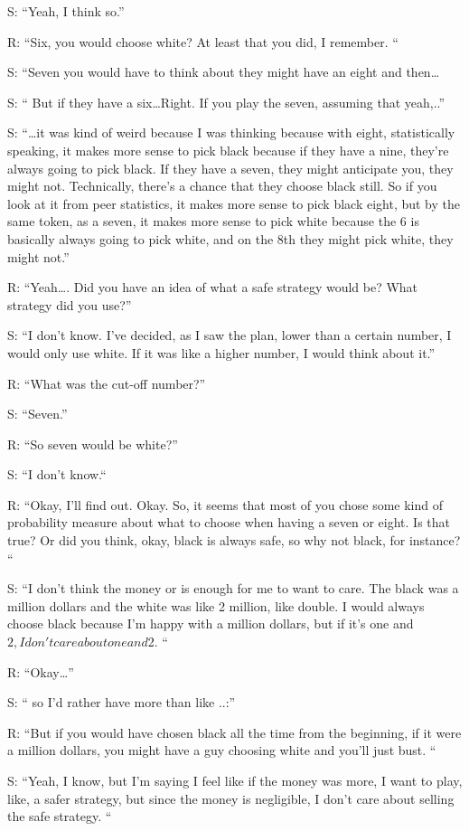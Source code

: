 \documentclass[a4paper,superscriptaddress,nofootinbib]{revtex4}
\begin{document}
S: “Yeah, I think so.”

R: “Six, you would choose white? At least that you did, I remember. “

S: “Seven you would have to think about they might have an eight and then…

S: “ But if they have a six…Right. If you play the seven, assuming that yeah,..”

S: “…it was kind of weird because I was thinking because with eight, statistically speaking, it makes more sense to pick black because if they have a nine, they're always going to pick black. If they have a seven, they might anticipate you, they might not. Technically, there's a chance that they choose black still. So if you look at it from peer statistics, it makes more sense to pick black eight, but by the same token, as a seven, it makes more sense to pick white because the 6 is basically always going to pick white, and on the 8th they might pick white, they might not.”

R: “Yeah…. Did you have an idea of what a safe strategy would be? What strategy did you use?”

S: “I don't know. I've decided, as I saw the plan, lower than a certain number, I would only use white. If it was like a higher number, I would think about it.”

R: “What was the cut-off number?”

S: “Seven.”

R: “So seven would be white?”

S: “I don't know.“

R: “Okay, I'll find out. Okay. So, it seems that most of you chose some kind of probability measure about what to choose when having a seven or eight. Is that true? Or did you think, okay, black is always safe, so why not black, for instance? “

S: “I don't think the money or is enough for me to want to care. The black was a million dollars and the white was like 2 million, like double. I would always choose black because I'm happy with a million dollars, but if it's one and $2, I don't care about one and $2. “

R: “Okay…”

S: “ so I'd rather have more than like ..:”

R: “But if you would have chosen black all the time from the beginning, if it were a million dollars, you might have a guy choosing white and you'll just bust. “

S: “Yeah, I know, but I'm saying I feel like if the money was more, I want to play, like, a safer strategy, but since the money is negligible, I don't care about selling the safe strategy. “ %
\end{document}
